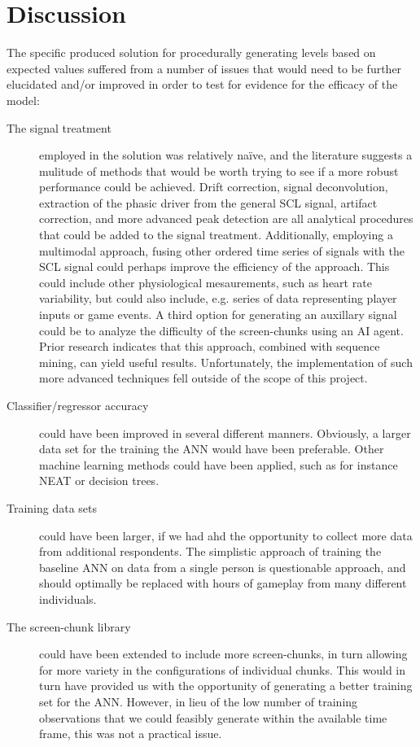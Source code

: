 \documentclass{llncs}
\begin{document}
\section{Discussion}
The specific produced solution for procedurally generating levels based on expected values suffered from a number of issues that would need to be further elucidated and/or improved in order to test for evidence for the efficacy of the model:
\begin{description}
\item [The signal treatment] employed in the solution was relatively naïve, and the literature suggests a mulitude of methods that would be worth trying to see if a more robust performance could be achieved. Drift correction, signal deconvolution, extraction of the phasic driver from the general SCL signal, artifact correction, and more advanced peak detection are all analytical procedures that could be added to the signal treatment.
Additionally, employing a multimodal approach, fusing other ordered time series of signals with the SCL signal could perhaps improve the efficiency of the approach\cite{martinez2011mining}. This could include other physiological mesaurements, such as heart rate variability, but could also include, e.g. series of data representing player inputs or game events. A third option for generating an auxillary signal could be to analyze the difficulty of the screen-chunks using an AI agent. Prior research indicates that this approach, combined with sequence mining, can yield useful results. Unfortunately, the implementation of such more advanced techniques fell outside of the scope of this project.
\item [Classifier/regressor accuracy] could have been improved in several different manners. Obviously, a larger data set for the training the ANN would have been preferable. Other machine learning methods could have been applied, such as for instance NEAT or decision trees.
\item [Training data sets] could have been larger, if we had ahd the opportunity to collect more data from additional respondents. The simplistic approach of training the baseline ANN on data from a single person is questionable approach, and should optimally be replaced with hours of gameplay from many different individuals.
\item [The screen-chunk library] could have been extended to include more screen-chunks, in turn allowing for more variety in the configurations of individual chunks. This would in turn have provided us with the opportunity of generating a better training set for the ANN. However, in lieu of the low number of training observations that we could feasibly generate within the available time frame, this was not a practical issue.
\end{description}
\end{document}
